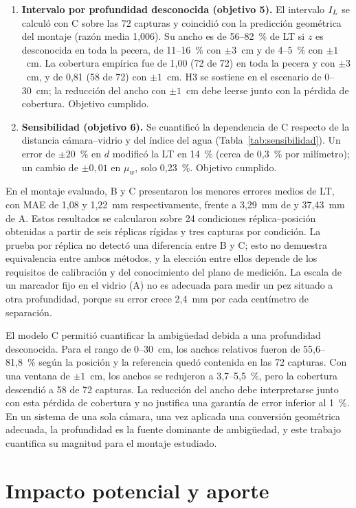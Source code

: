 \begin{enumerate}
  \item \textbf{Intervalo por profundidad desconocida (objetivo 5).} El intervalo $I_L$ se calculó con C sobre las 72 capturas y coincidió con la predicción geométrica del montaje (razón media 1,006). Su ancho es de 56--82~\% de LT si $z$ es desconocida en toda la pecera, de 11--16~\% con $\pm 3$~cm y de 4--5~\% con $\pm 1$~cm. La cobertura empírica fue de 1,00 (72 de 72) en toda la pecera y con $\pm 3$~cm, y de 0,81 (58 de 72) con $\pm 1$~cm. H3 se sostiene en el escenario de 0--30~cm; la reducción del ancho con $\pm 1$~cm debe leerse junto con la pérdida de cobertura. Objetivo cumplido.
  \item \textbf{Sensibilidad (objetivo 6).} Se cuantificó la dependencia de C respecto de la distancia cámara--vidrio y del índice del agua (Tabla~\ref{tab:sensibilidad}). Un error de $\pm 20$~\% en $d$ modificó la LT en 14~\% (cerca de 0,3~\% por milímetro); un cambio de $\pm 0{,}01$ en $\mu_w$, solo 0,23~\%. Objetivo cumplido.
\end{enumerate}

En el montaje evaluado, B y C presentaron los menores errores medios de LT, con MAE de 1,08 y 1,22~mm respectivamente, frente a 3,29~mm de \Aprime{} y 37,43~mm de A. Estos resultados se calcularon sobre 24 condiciones réplica--posición obtenidas a partir de seis réplicas rígidas y tres capturas por condición. La prueba por réplica no detectó una diferencia entre B y C; esto no demuestra equivalencia entre ambos métodos, y la elección entre ellos depende de los requisitos de calibración y del conocimiento del plano de medición. La escala de un marcador fijo en el vidrio (A) no es adecuada para medir un pez situado a otra profundidad, porque su error crece 2,4~mm por cada centímetro de separación.

El modelo C permitió cuantificar la ambigüedad debida a una profundidad desconocida. Para el rango de 0--30~cm, los anchos relativos fueron de 55,6--81,8~\% según la posición y la referencia quedó contenida en las 72 capturas. Con una ventana de $\pm 1$~cm, los anchos se redujeron a 3,7--5,5~\%, pero la cobertura descendió a 58 de 72 capturas. La reducción del ancho debe interpretarse junto con esta pérdida de cobertura y no justifica una garantía de error inferior al 1~\%. En un sistema de una sola cámara, una vez aplicada una conversión geométrica adecuada, la profundidad es la fuente dominante de ambigüedad, y este trabajo cuantifica su magnitud para el montaje estudiado.

\section{Impacto potencial y aporte}

